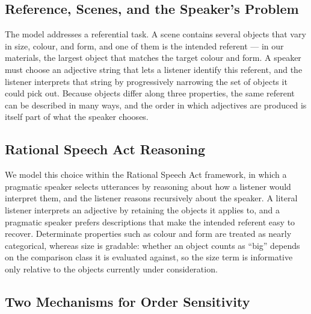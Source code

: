 \documentclass[man,floatsintext]{apa7}
\begin{document}
\subsection{Reference, Scenes, and the Speaker's Problem}
\label{sec:framework:scene}

The model addresses a referential task.
A scene contains several objects that vary in size, colour, and form, and one of them is the intended referent --- in our materials, the largest object that matches the target colour and form.
A speaker must choose an adjective string that lets a listener identify this referent, and the listener interprets that string by progressively narrowing the set of objects it could pick out.
Because objects differ along three properties, the same referent can be described in many ways, and the order in which adjectives are produced is itself part of what the speaker chooses.

\subsection{Rational Speech Act Reasoning}
\label{sec:framework:rsa}

We model this choice within the Rational Speech Act framework, in which a pragmatic speaker selects utterances by reasoning about how a listener would interpret them, and the listener reasons recursively about the speaker.
A literal listener interprets an adjective by retaining the objects it applies to, and a pragmatic speaker prefers descriptions that make the intended referent easy to recover.
Determinate properties such as colour and form are treated as nearly categorical, whereas size is gradable: whether an object counts as ``big'' depends on the comparison class it is evaluated against, so the size term is informative only relative to the objects currently under consideration.

\subsection{Two Mechanisms for Order Sensitivity}
\label{sec:framework:mechanisms}
\end{document}

